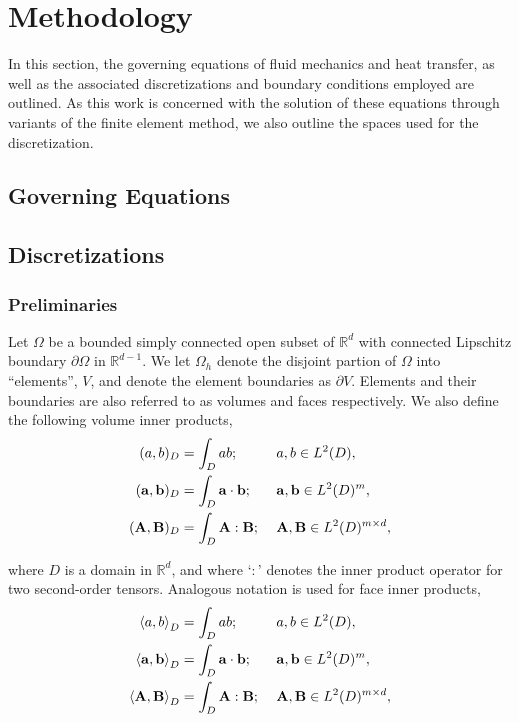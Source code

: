 \chapter{Methodology}

In this section, the governing equations of fluid mechanics and heat transfer, as well as the associated discretizations and boundary conditions employed are outlined. As this work is concerned with the solution of these equations through variants of the finite element method, we also outline the spaces used for the discretization.



\section{Governing Equations} \label{sec:governing_eqns_NS}


\section{Discretizations}

\subsection{Preliminaries}
Let $\Omega$ be a bounded simply connected open subset of $\mathbb{R}^d$ with connected Lipschitz boundary $\partial \Omega$ in $\mathbb{R}^{d-1}$. We let $\Omega_h$ denote the disjoint partion of $\Omega$ into ``elements'', $V$, and denote the element boundaries as $\partial V$. Elements and their boundaries are also referred to as volumes and faces respectively. We also define the following volume inner products,
\begin{alignat*}{5}
(a,b)_D & = \int_D ab;\ && a, b \in L^2(D), \\
(\vect{a},\vect{b})_D & = \int_D \vect{a} \cdot \vect{b};\ && \vect{a}, \vect{b} \in L^2(D)^m, \\
(\vect{A},\vect{B})_D & = \int_D \vect{A} : \vect{B};\ && \vect{A}, \vect{B} \in L^2(D)^{m \times d},
\end{alignat*}

where $D$ is a domain in $\mathbb{R}^d$, and where `$:$' denotes the inner product operator for two second-order tensors. Analogous notation is used for face inner products,
\begin{alignat*}{5}
\left< a,b \right>_D & = \int_D ab;\ && a, b \in L^2(D), \\
\left< \mathbf{{a}},\mathbf{{b}} \right>_D & = \int_D \mathbf{{a}} \cdot \mathbf{{b}};\ && \mathbf{{a}}, \mathbf{{b}} \in L^2(D)^m, \\
\left<\mathbf{{A}},\mathbf{{B}}\right>_D & = \int_D \mathbf{{A}} : \mathbf{{B}};\ && \mathbf{{A}}, \mathbf{{B}} \in L^2(D)^{m \times d},
\end{alignat*}

